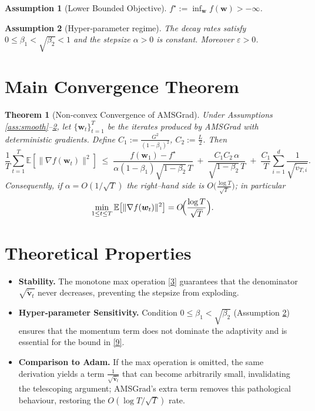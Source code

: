 \documentclass{article}
\newtheorem{theorem}{Theorem}
\newtheorem{assumption}{Assumption}
\newcommand{\E}{\mathbb{E}}
\begin{document}
\begin{assumption}[Lower Bounded Objective]\label{ass:lb}
$f^{\star}:=\inf_{\bm{w}}f(\bm{w})>-\infty$.
\end{assumption}

\begin{assumption}[Hyper‑parameter regime]\label{ass:params}
The decay rates satisfy $0\le\beta_{1}<\sqrt{\beta_{2}}<1$ and the stepsize
$\alpha>0$ is constant. Moreover $\varepsilon>0$.
\end{assumption}

\section*{Main Convergence Theorem}
\begin{theorem}[Non‑convex Convergence of AMSGrad]\label{thm:main}
Under Assumptions \ref{ass:smooth}–\ref{ass:params}, let $\{\bm{w}_{t}\}_{t=1}^{T}$
be the iterates produced by AMSGrad with deterministic gradients.
Define $C_{1}:=\frac{G^{2}}{(1-\beta_{1})^{2}}$, $C_{2}:=\frac{L}{2}$.
Then
\[
\frac{1}{T}\sum_{t=1}^{T}\E\!\left[\|\nabla f(\bm{w}_{t})\|^{2}\right]
\;\le\;
\frac{f(\bm{w}_{1})-f^{\star}}{\alpha (1-\beta_{1})\sqrt{1-\beta_{2}}\,T}
\;+\;
\frac{C_{1}C_{2}\,\alpha}{\sqrt{1-\beta_{2}}\,T}
\;+\;
\frac{C_{1}}{T}\sum_{i=1}^{d}\frac{1}{\sqrt{\tilde v_{T,i}}}.
\tag{9}
\]
Consequently, if $\alpha=O(1/\sqrt{T})$ the right–hand side is
$O\!\bigl(\frac{\log T}{\sqrt{T}}\bigr)$; in particular
\[
\min_{1\le t\le T}\E\!\left[\|\nabla f(\bm{w}_{t})\|^{2}\right]
=O\!\Bigl(\frac{\log T}{\sqrt{T}}\Bigr).
\]
\end{theorem}

\section*{Theoretical Properties}
\begin{itemize}
\item \textbf{Stability.} The monotone max operation \eqref{3} guarantees that the denominator
$\sqrt{\tilde{\bm v}_{t}}$ never decreases, preventing the stepsize from exploding.
\item \textbf{Hyper‑parameter Sensitivity.}
Condition $0\le\beta_{1}<\sqrt{\beta_{2}}$ (Assumption \ref{ass:params})
ensures that the momentum term does not dominate the adaptivity
and is essential for the bound in \eqref{9}.
\item \textbf{Comparison to Adam.}
If the max operation is omitted, the same derivation yields a term
$\frac{1}{\sqrt{\hat{\bm v}_{t}}}$ that can become arbitrarily small,
invalidating the telescoping argument; AMSGrad’s extra term
removes this pathological behaviour, restoring the $O(\log T/\sqrt{T})$ rate.
\end{itemize}
\end{document}
